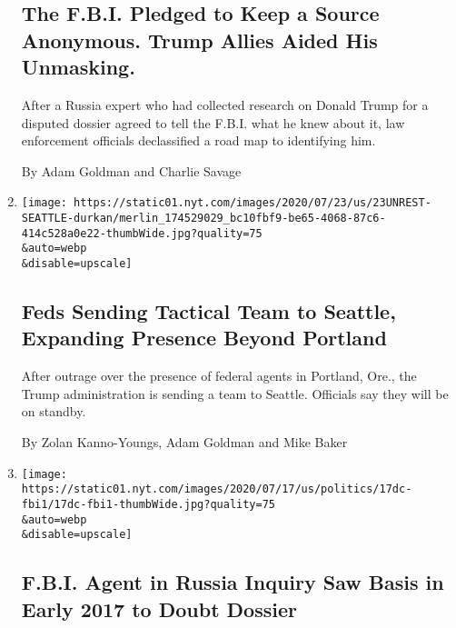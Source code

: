 \begin{enumerate}
  \hypertarget{the-fbi-pledged-to-keep-a-source-anonymous-trump-allies-aided-his-unmasking}{%
  \subsection{The F.B.I. Pledged to Keep a Source Anonymous. Trump
  Allies Aided His
  Unmasking.}\label{the-fbi-pledged-to-keep-a-source-anonymous-trump-allies-aided-his-unmasking}}

  After a Russia expert who had collected research on Donald Trump for a
  disputed dossier agreed to tell the F.B.I. what he knew about it, law
  enforcement officials declassified a road map to identifying him.

  By Adam Goldman and Charlie Savage
\item
  \href{/2020/07/23/us/seattle-protests-feds.html}{}

  \texttt{[image: https://static01.nyt.com/images/2020/07/23/us/23UNREST-SEATTLE-durkan/merlin\_174529029\_bc10fbf9-be65-4068-87c6-414c528a0e22-thumbWide.jpg?quality=75\\\&auto=webp\\\&disable=upscale]}

  \hypertarget{feds-sending-tactical-team-to-seattle-expanding-presence-beyond-portland}{%
  \subsection{Feds Sending Tactical Team to Seattle, Expanding Presence
  Beyond
  Portland}\label{feds-sending-tactical-team-to-seattle-expanding-presence-beyond-portland}}

  After outrage over the presence of federal agents in Portland, Ore.,
  the Trump administration is sending a team to Seattle. Officials say
  they will be on standby.

  By Zolan Kanno-Youngs, Adam Goldman and Mike Baker
\item
  \href{/2020/07/17/us/politics/steele-dossier-peter-strzok.html}{}

  \texttt{[image: https://static01.nyt.com/images/2020/07/17/us/politics/17dc-fbi1/17dc-fbi1-thumbWide.jpg?quality=75\\\&auto=webp\\\&disable=upscale]}

  \hypertarget{fbi-agent-in-russia-inquiry-saw-basis-in-early-2017-to-doubt-dossier}{%
  \subsection{F.B.I. Agent in Russia Inquiry Saw Basis in Early 2017 to
  Doubt
  Dossier}\label{fbi-agent-in-russia-inquiry-saw-basis-in-early-2017-to-doubt-dossier}}


\end{enumerate}
